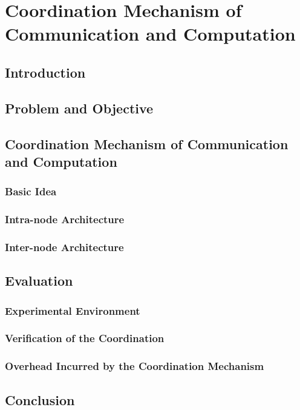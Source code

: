 \chapter{Coordination Mechanism of Communication and Computation}

\section{Introduction}

\section{Problem and Objective}

\section{Coordination Mechanism of Communication and Computation}

\subsection{Basic Idea}

\subsection{Intra-node Architecture}

\subsection{Inter-node Architecture}

\section{Evaluation}

\subsection{Experimental Environment}

\subsection{Verification of the Coordination}

\subsection{Overhead Incurred by the Coordination Mechanism}

\section{Conclusion}
